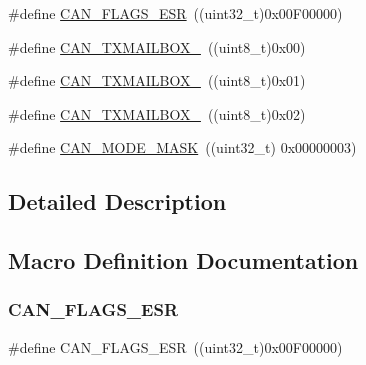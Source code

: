 \begin{DoxyCompactItemize}
\item 
\#define \mbox{\hyperlink{group___c_a_n___private___defines_ga14f7bb0b320da21443c9bd60b1f86b5d}{C\+A\+N\+\_\+\+F\+L\+A\+G\+S\+\_\+\+E\+SR}}~((uint32\+\_\+t)0x00\+F00000)
\item 
\#define \mbox{\hyperlink{group___c_a_n___private___defines_gaa62f09d0693681cb7576f61c93b7cf0f}{C\+A\+N\+\_\+\+T\+X\+M\+A\+I\+L\+B\+O\+X\+\_}}~((uint8\+\_\+t)0x00)
\item 
\#define \mbox{\hyperlink{group___c_a_n___private___defines_ga4e20f0aac1ac940014a6c66971890943}{C\+A\+N\+\_\+\+T\+X\+M\+A\+I\+L\+B\+O\+X\+\_}}~((uint8\+\_\+t)0x01)
\item 
\#define \mbox{\hyperlink{group___c_a_n___private___defines_ga8a842aa352d72321930cc963b26bf6d7}{C\+A\+N\+\_\+\+T\+X\+M\+A\+I\+L\+B\+O\+X\+\_}}~((uint8\+\_\+t)0x02)
\item 
\#define \mbox{\hyperlink{group___c_a_n___private___defines_ga79094ce5a3a2f717140e8cc9b7c161b6}{C\+A\+N\+\_\+\+M\+O\+D\+E\+\_\+\+M\+A\+SK}}~((uint32\+\_\+t) 0x00000003)
\end{DoxyCompactItemize}


\subsection{Detailed Description}


\subsection{Macro Definition Documentation}
\mbox{\label{group___c_a_n___private___defines_ga14f7bb0b320da21443c9bd60b1f86b5d}} 
\subsubsection{\texorpdfstring{CAN\_FLAGS\_ESR}{CAN\_FLAGS\_ESR}}
{\footnotesize\ttfamily \#define C\+A\+N\+\_\+\+F\+L\+A\+G\+S\+\_\+\+E\+SR~((uint32\+\_\+t)0x00\+F00000)}

\mbox{\label{group___c_a_n___private___defines_ga3aaa7df395ce1a90cb6e2ff3d2c4b24e}} 
